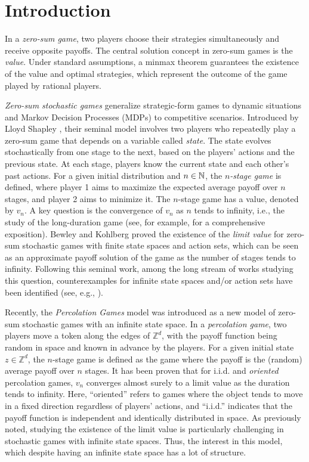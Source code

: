 \section{Introduction}
	In a \emph{zero-sum game}, two players choose their strategies simultaneously and receive opposite payoffs. The central solution concept in zero-sum games is the \emph{value}. Under standard assumptions, a minmax theorem \cite[Appendix A.5]{Sorin2002} guarantees the existence of the value and optimal strategies, which represent the outcome of the game played by rational players.

	\emph{Zero-sum stochastic games} generalize strategic-form games to dynamic situations and Markov Decision Processes (MDPs) to competitive scenarios. Introduced by Lloyd Shapley \cite{Shapley1953}, their seminal model involves two players who repeatedly play a zero-sum game that depends on a variable called \emph{state}. The state evolves stochastically from one stage to the next, based on the players' actions and the previous state. At each stage, players know the current state and each other's past actions. For a given initial distribution and $n \in \mathbb{N}$, the \textit{$n$-stage game} is defined, where player 1 aims to maximize the expected average payoff over $n$ stages, and player 2 aims to minimize it. The $n$-stage game has a value, denoted by $v_n$. A key question is the convergence of $v_n$ as $n$ tends to infinity, i.e., the study of the long-duration game (see, for example, \cite{LarakiSorin2015} for a comprehensive exposition). Bewley and Kohlberg \cite{BewleyKohlberg1976} proved the existence of the \emph{limit value} for zero-sum stochastic games with finite state spaces and action sets, which can be seen as an approximate payoff solution of the game as the number of stages tends to infinity. Following this seminal work, among the long stream of works studying this question, counterexamples for infinite state spaces and/or action sets have been identified (see, e.g., \cite{Vigeral2013, Ziliotto2016}).

	Recently, the \emph{Percolation Games} model \cite{GarnierZiliotto2022} was introduced as a new model of zero-sum stochastic games with an infinite state space. In a \textit{percolation game}, two players move a token along the edges of $\mathbb{Z}^d$, with the payoff function being random in space and known in advance by the players. For a given initial state $z \in \mathbb{Z}^d$, the $n$-stage game is defined as the game where the payoff is the (random) average payoff over $n$ stages. It has been proven that for i.i.d. and \textit{oriented} percolation games, $v_n$ converges almost surely to a limit value as the duration tends to infinity. Here, ``oriented'' refers to games where the object tends to move in a fixed direction regardless of players' actions, and ``i.i.d.'' indicates that the payoff function is independent and identically distributed in space. As previously noted, studying the existence of the limit value is particularly challenging in stochastic games with infinite state spaces. Thus, the interest in this model, which despite having an infinite state space has a lot of structure.

